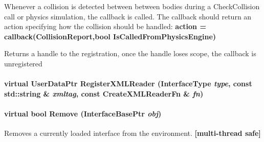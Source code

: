 Whenever a collision is detected between between bodies during a CheckCollision call or physics simulation, the callback is called. The callback should return an action specifying how the collision should be handled: {\bfseries action = callback(CollisionReport,bool IsCalledFromPhysicsEngine)} \begin{DoxyReturn}{Returns}
a handle to the registration, once the handle loses scope, the callback is unregistered 
\end{DoxyReturn}
\hypertarget{classOpenRAVE_1_1EnvironmentBase_a15f83ec6ea57058090ca016f06e63870}{
\paragraph[{RegisterXMLReader}]{\setlength{\rightskip}{0pt plus 5cm}virtual UserDataPtr RegisterXMLReader (InterfaceType {\em type}, \/  const std::string \& {\em xmltag}, \/  const CreateXMLReaderFn \& {\em fn})}\hfill}
\label{classOpenRAVE_1_1EnvironmentBase_a15f83ec6ea57058090ca016f06e63870}
\hypertarget{classOpenRAVE_1_1EnvironmentBase_add0aaa9d6ac1aaeb25b3c71b85a93e79}{
\paragraph[{Remove}]{\setlength{\rightskip}{0pt plus 5cm}virtual bool Remove (InterfaceBasePtr {\em obj})}\hfill}
\label{classOpenRAVE_1_1EnvironmentBase_add0aaa9d6ac1aaeb25b3c71b85a93e79}


Removes a currently loaded interface from the environment. {\bfseries \mbox{[}multi-\/thread safe\mbox{]}} 

